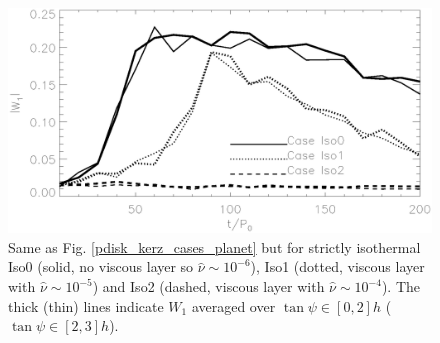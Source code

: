 

\begin{figure}
  \centering
  \includegraphics[width=\linewidth]{figures/pdisk_kerz_cases_iso}
  \caption{Same as Fig. \ref{pdisk_kerz_cases_planet} but for strictly
    isothermal Iso0 (solid, no viscous layer so $\hat{\nu}\sim10^{-6}$), Iso1
    (dotted, viscous layer with $\hat{\nu}\sim10^{-5}$) and Iso2
    (dashed, viscous layer with $\hat{\nu}\sim10^{-4}$). The thick (thin) lines indicate
    $W_1$ averaged over $\tan{\psi}\in[0,2]h$
    ($\tan{\psi}\in[2,3]h$).  
    \label{pdisk_kerz_cases_planet_iso}}
\end{figure}
